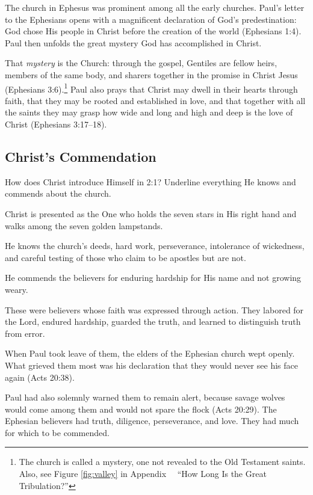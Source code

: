 The church in Ephesus was prominent among all the early churches.
Paul's letter to the Ephesians opens with a magnificent declaration of God's predestination: God chose His people in Christ before the creation of the world (Ephesians 1:4). Paul then unfolds the great mystery God has accomplished in Christ.

That \textit{mystery} is the Church: through the gospel, Gentiles are fellow heirs, members of the same body, and sharers together in the promise in Christ Jesus (Ephesians 3:6).\footnote{The church is called a mystery, one not revealed to the Old Testament saints. Also, see Figure \ref{fig:valley}
in Appendix~\thechapter~ ``How Long Is the Great Tribulation?''}
Paul also prays that Christ may dwell in their hearts through faith, that they may be rooted and established in love, and that together with all the saints they may grasp how wide and long and high and deep is the love of Christ (Ephesians 3:17--18).

\subsection{Christ's Commendation}

\begin{ScriptureBox2}{How does Christ introduce Himself in 2:1? Underline everything He knows and commends about the church.}
\item[2:1] Christ is presented as the One who holds the seven stars in His right hand and walks among the seven golden lampstands.

\item[2:2] He knows the church's deeds, hard work, perseverance, intolerance of wickedness, and careful testing of those who claim to be apostles but are not.

\item[2:3] He commends the believers for enduring hardship for His name and not growing weary.
\end{ScriptureBox2}

These were believers whose faith was expressed through action. They labored for the Lord, endured hardship, guarded the truth, and learned to distinguish truth from error.

When Paul took leave of them, the elders of the Ephesian church wept openly. What grieved them most was his declaration that they would never see his face again (Acts 20:38).

Paul had also solemnly warned them to remain alert, because savage wolves would come among them and would not spare the flock (Acts 20:29). The Ephesian believers had truth, diligence, perseverance, and love. They had much for which to be commended.

